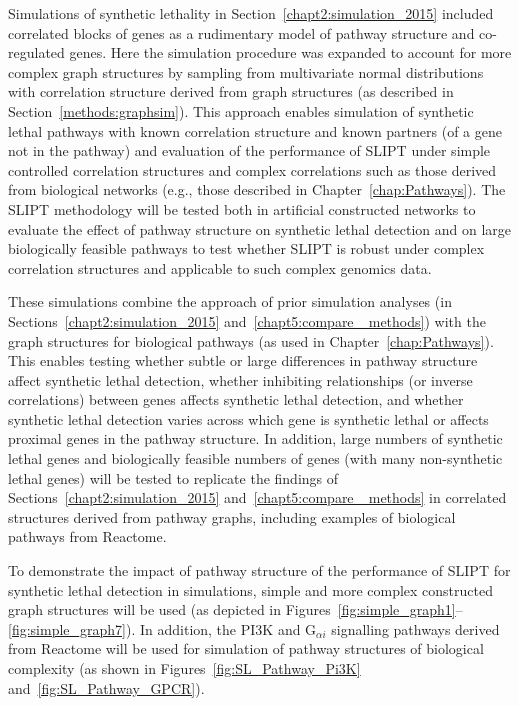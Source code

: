 Simulations of synthetic lethality in Section~\ref{chapt2:simulation_2015} included correlated blocks of genes as a rudimentary model of pathway structure and co-regulated genes. Here the simulation procedure was expanded to account for more complex graph structures by sampling from multivariate normal distributions with correlation structure derived from graph structures (as described in Section~\ref{methods:graphsim}). This approach enables simulation of synthetic lethal pathways with known correlation structure and known partners (of a gene not in the pathway) and evaluation of the performance of \gls{SLIPT} under simple controlled correlation structures and complex correlations such as those derived from biological networks (e.g., those described in Chapter~\ref{chap:Pathways}). The \gls{SLIPT} methodology will be tested both in artificial constructed networks to evaluate the effect of pathway structure on synthetic lethal detection and on large biologically feasible pathways to test whether \gls{SLIPT} is robust under complex correlation structures and applicable to such complex genomics data.

These simulations combine the approach of prior simulation analyses (in Sections~\ref{chapt2:simulation_2015} and~\ref{chapt5:compare_ methods}) with the graph structures for biological pathways (as used in Chapter~\ref{chap:Pathways}). This enables testing whether subtle or large differences in pathway structure affect synthetic lethal detection, whether inhibiting relationships (or inverse correlations) between genes affects synthetic lethal detection, and whether synthetic lethal detection varies across which gene is synthetic lethal or affects proximal genes in the pathway structure. In addition, large numbers of synthetic lethal genes and biologically feasible numbers of genes (with many non-synthetic lethal genes) will be tested to replicate the findings of Sections~\ref{chapt2:simulation_2015} and~\ref{chapt5:compare_ methods} in correlated structures derived from pathway graphs, including examples of biological pathways from Reactome.

To demonstrate the impact of pathway structure of the performance of \gls{SLIPT} for synthetic lethal detection in simulations, simple and more complex constructed graph structures will be used (as depicted in Figures~\ref{fig:simple_graph1}\nobreakdash--\ref{fig:simple_graph7}). In addition, the \gls{PI3K} and G$_{\alpha i}$ signalling pathways derived from Reactome will be used for simulation of pathway structures of biological complexity (as shown in Figures~\ref{fig:SL_Pathway_Pi3K} and~\ref{fig:SL_Pathway_GPCR}).

